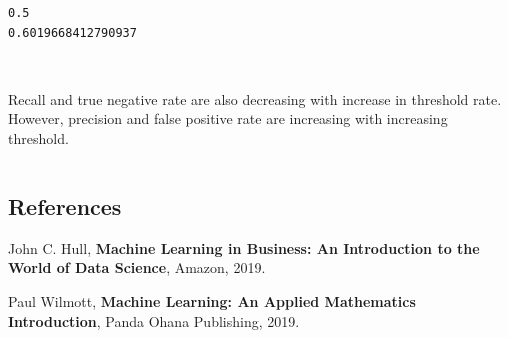 \documentclass[11pt]{article}
\makeatletter
\newcommand{\boxspacing}{\kern\kvtcb@left@rule\kern\kvtcb@boxsep}
\newcommand{\prompt}[4]{
        {\ttfamily\llap{{\color{#2}[#3]:\hspace{3pt}#4}}\vspace{-\baselineskip}}
    }
\makeatother
\begin{document}
    \begin{Verbatim}[commandchars=\\\{\}]
0.5
0.6019668412790937
    \end{Verbatim}

    \begin{center}
    \end{center}
    { \hspace*{\fill} \\}
    
    Recall and true negative rate are also decreasing with increase in
threshold rate. However, precision and false positive rate are
increasing with increasing threshold.

    \begin{tcolorbox}[breakable, size=fbox, boxrule=1pt, pad at break*=1mm,colback=cellbackground, colframe=cellborder]
\prompt{In}{incolor}{ }{\boxspacing}
\begin{Verbatim}[commandchars=\\\{\}]

\end{Verbatim}
\end{tcolorbox}

    \hypertarget{references}{%
\subsection{References}\label{references}}

    John C. Hull, \textbf{Machine Learning in Business: An Introduction to
the World of Data Science}, Amazon, 2019.

Paul Wilmott, \textbf{Machine Learning: An Applied Mathematics
Introduction}, Panda Ohana Publishing, 2019.


    
    
    
\end{document}

